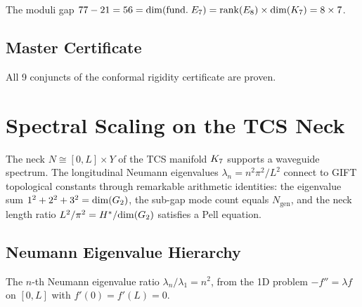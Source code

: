 \begin{theorem}[$\bthree - \btwo = \opdim(\mathrm{fund.}\; E_7)$]\label{thm:moduli_gap}
    \leanok
    The moduli gap $77 - 21 = 56 = \mathrm{dim}(\mathrm{fund.}\; E_7)
    = \mathrm{rank}(E_8) \times \mathrm{dim}(K_7) = 8 \times 7$.
\end{theorem}

\section{Master Certificate}

\begin{theorem}\label{thm:conformal_rigidity_cert}
    \leanok
    All 9 conjuncts of the conformal rigidity certificate are proven.
\end{theorem}


\chapter{Spectral Scaling on the TCS Neck}\label{chap:spectral_scaling}

The neck $N \cong [0,L] \times Y$ of the TCS manifold $K_7$ supports a
waveguide spectrum. The longitudinal Neumann eigenvalues
$\lambda_n = n^2 \pi^2/L^2$ connect to GIFT topological constants through
remarkable arithmetic identities: the eigenvalue sum $1^2+2^2+3^2 = \mathrm{dim}(G_2)$,
the sub-gap mode count equals $N_{\mathrm{gen}}$, and the neck length ratio
$L^2/\pi^2 = H^*/\mathrm{dim}(G_2)$ satisfies a Pell equation.

\section{Neumann Eigenvalue Hierarchy}

\begin{definition}\label{def:neumann_ratio}
    \leanok
    The $n$-th Neumann eigenvalue ratio $\lambda_n/\lambda_1 = n^2$,
    from the 1D problem $-f'' = \lambda f$ on $[0,L]$ with $f'(0) = f'(L) = 0$.
\end{definition}

